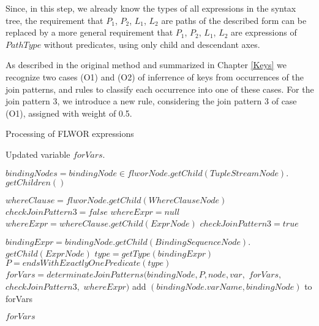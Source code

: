 Since, in this step, we already know the types of all expressions in the syntax tree, the requirement that $P_1$, $P_2$, $L_1$, $L_2$ are paths of the described form can be replaced by a more general requirement that $P_1$, $P_2$, $L_1$, $L_2$ are expressions of $PathType$ without predicates, using only child and descendant axes.

As described in the original method and summarized in Chapter \ref{Keys} we recognize two cases (O1) and (O2) of inferrence of keys from occurrences of the join patterns, and rules to classify each occurrence into one of these cases. For the join pattern 3, we introduce a new rule, considering the join pattern 3 of case (O1), assigned with weight of 0.5. 

\begin{algorithm}
\caption{Processing of FLWOR expressions}
\label{ALG_processing_of_flwor_expressions}
\begin{algorithmic}[1]

\ENSURE Updated variable $forVars$.

\STATE $bindingNodes = bindingNode \in flworNode.getChild(TupleStreamNode).$ $getChildren()$

\STATE $whereClause = flworNode.getChild(WhereClauseNode)$
\STATE $checkJoinPattern3 = false$
\STATE $whereExpr = null$
    \STATE $whereExpr = whereClause.getChild(ExprNode)$
        \STATE $checkJoinPattern3 = true$
    \ENDIF
\ENDIF

    \STATE $bindingExpr = bindingNode.getChild(BindingSequenceNode).$ $getChild(ExprNode)$
    \STATE $type = getType(bindingExpr)$
    	\STATE $P = endsWithExactlyOnePredicate(type)$
            	\STATE $forVars = determinateJoinPatterns(bindingNode, P, node, var,$ $forVars,$ $checkJoinPattern3,$ $whereExpr)$
        	\ENDFOR
            	\STATE add $(bindingNode.varName, bindingNode)$ to forVars
        	\ENDIF
        \ENDIF
    \ENDIF
\ENDFOR

\RETURN $forVars$
\end{algorithmic}
\end{algorithm}

